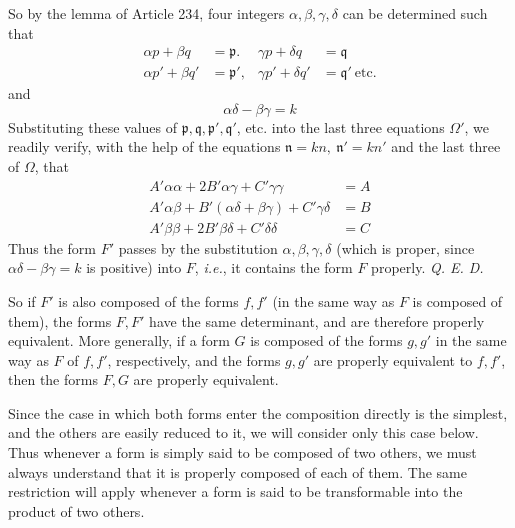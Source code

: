 So by the lemma of Article 234, four integers $\alpha,\beta,\gamma,\delta$ can be determined such that
\[
\begin{aligned}
\alpha p+\beta q&=\mathfrak{p}.&\gamma p+\delta q&=\mathfrak{q}\\
\alpha p'+\beta q'&=\mathfrak{p}',&\gamma p'+\delta q'&=\mathfrak{q}'\ \text{etc.}
\end{aligned}
\]
and
\[
\alpha\delta-\beta\gamma=k
\]
Substituting these values of $\mathfrak{p},\mathfrak{q},\mathfrak{p}',\mathfrak{q}'$, etc. into the last three equations $\Omega'$, we readily verify, with the help of the equations $\mathfrak{n}=kn,\ \mathfrak{n}'=kn'$ and the last three of $\Omega$, that
\[
\begin{aligned}
A'\alpha\alpha+2B'\alpha\gamma+C'\gamma\gamma&=A\\
A'\alpha\beta+B'(\alpha\delta+\beta\gamma)+C'\gamma\delta&=B\\
A'\beta\beta+2B'\beta\delta+C'\delta\delta&=C
\end{aligned}
\]
Thus the form $F'$ passes by the substitution $\alpha,\beta,\gamma,\delta$ (which is proper, since $\alpha\delta-\beta\gamma=k$ is positive) into $F$, \textit{i.e.}, it contains the form $F$ properly. \textit{Q. E. D.}

So if $F'$ is also composed of the forms $f,f'$ (in the same way as $F$ is composed of them), the forms $F,F'$ have the same determinant, and are therefore properly equivalent. More generally, if a form $G$ is composed of the forms $g,g'$ in the same way as
$F$ of $f,f'$, respectively, and the forms $g,g'$ are properly equivalent to $f,f'$, then the forms $F,G$ are properly equivalent.

Since the case in which both forms enter the composition directly is the simplest, and the others are easily reduced to it, we will consider only this case below. Thus whenever a form is simply said to be composed of two others, we must always understand that it is properly composed of each of them. The same restriction will apply whenever a form is said to be transformable into the product of two others.
